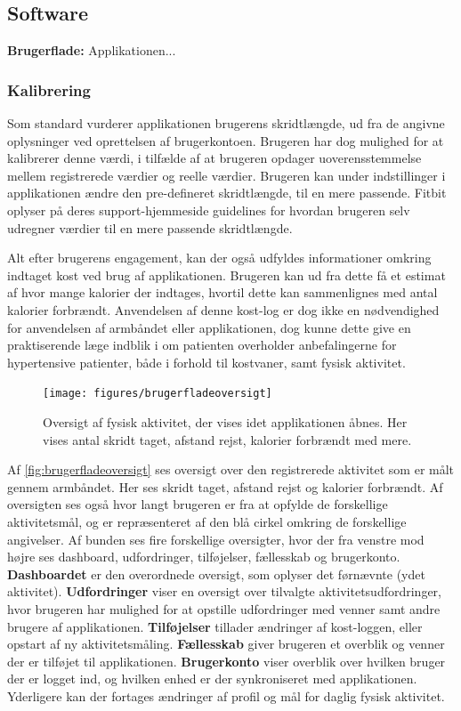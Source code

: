 \subsection{Software}
\textbf{Brugerflade:} %
Applikationen...  

\subsubsection{Kalibrering}
Som standard vurderer applikationen brugerens skridtlængde, ud fra de angivne oplysninger ved oprettelsen af brugerkontoen. Brugeren har dog mulighed for at kalibrerer denne værdi, i tilfælde af at brugeren opdager uoverensstemmelse mellem registrerede værdier og reelle værdier. Brugeren kan under indstillinger i applikationen ændre den pre-defineret skridtlængde, til en mere passende. Fitbit oplyser på deres support-hjemmeside guidelines for hvordan brugeren selv udregner værdier til en mere passende skridtlængde.   

Alt efter brugerens engagement, kan der også udfyldes informationer omkring indtaget kost ved brug af applikationen. Brugeren kan ud fra dette få et estimat af hvor mange kalorier der indtages, hvortil dette kan sammenlignes med antal kalorier forbrændt. Anvendelsen af denne kost-log er dog ikke en nødvendighed for anvendelsen af armbåndet eller applikationen, dog kunne dette give en praktiserende læge indblik i om patienten overholder anbefalingerne for hypertensive patienter, både i forhold til kostvaner, samt fysisk aktivitet.  

\begin{figure}[H]
	\centering
	\texttt{[image: figures/brugerfladeoversigt]}
	\caption{Oversigt af fysisk aktivitet, der vises idet applikationen åbnes. Her vises antal skridt taget, afstand rejst, kalorier forbrændt med mere.}
	\label{fig:brugerfladeoversigt}
\end{figure}

Af \autoref{fig:brugerfladeoversigt} ses oversigt over den registrerede aktivitet som er målt gennem armbåndet. Her ses skridt taget, afstand rejst og kalorier forbrændt. Af oversigten ses også hvor langt brugeren er fra at opfylde de forskellige aktivitetsmål, og er repræsenteret af den blå cirkel omkring de forskellige angivelser. 
Af bunden ses fire forskellige oversigter, hvor der fra venstre mod højre ses dashboard, udfordringer, tilføjelser, fællesskab og brugerkonto. \textbf{Dashboardet} er den overordnede oversigt, som oplyser det førnævnte (ydet aktivitet). 
\textbf{Udfordringer} viser en oversigt over tilvalgte aktivitetsudfordringer, hvor brugeren har mulighed for at opstille udfordringer med venner samt andre brugere af applikationen. 
\textbf{Tilføjelser} tillader ændringer af kost-loggen, eller opstart af ny aktivitetsmåling. 
\textbf{Fællesskab} giver brugeren et overblik og venner der er tilføjet til applikationen. 
\textbf{Brugerkonto} viser overblik over hvilken bruger der er logget ind, og hvilken enhed er der synkroniseret med applikationen. Yderligere kan der fortages ændringer af profil og mål for daglig fysisk aktivitet. 

